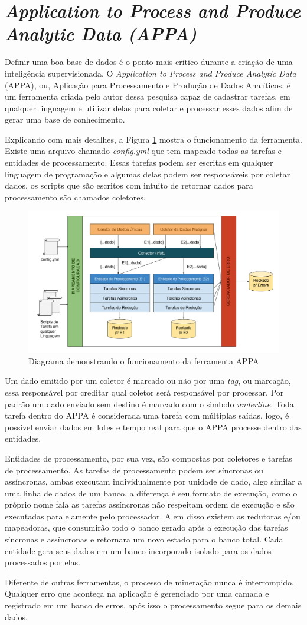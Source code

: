 \section{\textit{Application to Process and Produce Analytic Data (APPA)}}

Definir uma boa base de dados é o ponto mais critico durante a criação de uma inteligência supervisionada. O \textit{Application to Process and Produce Analytic Data} (APPA), ou, Aplicação para Processamento e Produção de Dados Analíticos, é um ferramenta criada pelo autor dessa pesquisa capaz de cadastrar tarefas, em qualquer linguagem e utilizar delas para coletar e processar esses dados afim de gerar uma base de conhecimento.

Explicando com mais detalhes, a Figura \ref{fig:appa_eng} mostra o funcionamento da ferramenta. Existe uma arquivo chamado \textit{config.yml} que tem mapeado todas as tarefas e entidades de processamento. Essas tarefas podem ser escritas em qualquer linguagem de programação e algumas delas podem ser responsáveis por coletar dados, os scripts que são escritos com intuito de retornar dados para processamento são chamados coletores.

\begin{figure}
    \centering
    \includegraphics[width=.8\textwidth]{imagens/appa_eng.png}
    \caption{Diagrama demonstrando o funcionamento da ferramenta APPA}
    \label{fig:appa_eng}
\end{figure}

Um dado emitido por um coletor é marcado ou não por uma \textit{tag}, ou marcação, essa responsável por creditar qual coletor será responsável por processar. Por padrão um dado enviado sem destino é marcado com o simbolo \textit{underline}. Toda tarefa dentro do APPA é considerada uma tarefa com múltiplas saídas, logo, é possível enviar dados em lotes e tempo real para que o APPA processe dentro das entidades. 

Entidades de processamento, por sua vez, são compostas por coletores e tarefas de processamento. As tarefas de processamento podem ser síncronas ou assíncronas, ambas executam individualmente por unidade de dado, algo similar a uma linha de dados de um banco, a diferença é seu formato de execução, como o próprio nome fala as tarefas assíncronas não respeitam ordem de execução e são executadas paralelamente pelo processador. Alem disso existem as redutoras e/ou mapeadoras, que consumirão todo o banco gerado após a execução das tarefas síncronas e assíncronas e retornara um novo estado para o banco total. Cada entidade gera seus dados em um banco incorporado isolado para os dados processados por elas.

Diferente de outras ferramentas, o processo de mineração nunca é interrompido. Qualquer erro que aconteça na aplicação é gerenciado por uma camada e registrado em um banco de erros, após isso o processamento segue para os demais dados.

